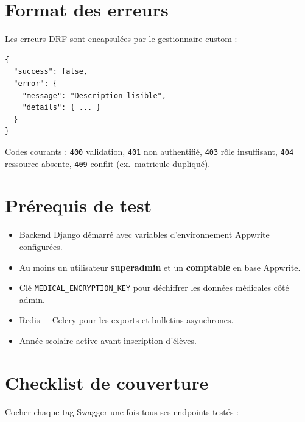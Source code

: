 \documentclass[11pt,a4paper]{article}
\begin{document}
\section{Format des erreurs}

Les erreurs DRF sont encapsulées par le gestionnaire custom :
\begin{verbatim}
{
  "success": false,
  "error": {
    "message": "Description lisible",
    "details": { ... }
  }
}
\end{verbatim}

Codes courants : \texttt{400} validation, \texttt{401} non authentifié, \texttt{403} rôle insuffisant, \texttt{404} ressource absente, \texttt{409} conflit (ex.\ matricule dupliqué).

\section{Prérequis de test}

\begin{itemize}[noitemsep]
    \item Backend Django démarré avec variables d'environnement Appwrite configurées.
    \item Au moins un utilisateur \textbf{superadmin} et un \textbf{comptable} en base Appwrite.
    \item Clé \texttt{MEDICAL\_ENCRYPTION\_KEY} pour déchiffrer les données médicales côté admin.
    \item Redis + Celery pour les exports et bulletins asynchrones.
    \item Année scolaire active avant inscription d'élèves.
\end{itemize}

\section{Checklist de couverture}

Cocher chaque tag Swagger une fois tous ses endpoints testés :
\end{document}
